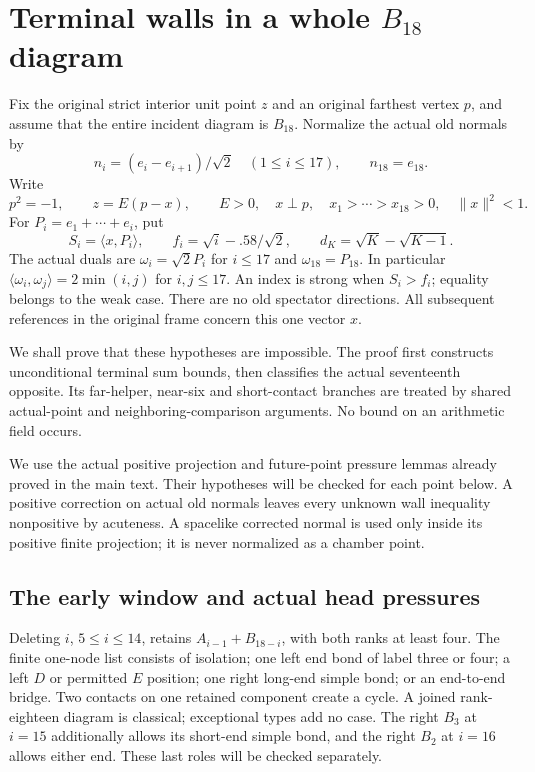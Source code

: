 \documentclass[11pt]{article}
\theoremstyle{definition}
\theoremstyle{remark}
\newcommand{\ip}[2]{\langle #1,#2\rangle}
\newcommand{\norm}[1]{\lVert #1\rVert}
\begin{document}
\section{Terminal walls in a whole \(B_{18}\) diagram}
\label{app:wholeB18}
Fix the original strict interior unit point \(z\) and an original
farthest vertex \(p\), and assume that the entire incident diagram
is \(B_{18}\). Normalize the actual old normals by
\[
 n_i=(e_i-e_{i+1})/\sqrt2\quad(1\leq i\leq17),\qquad n_{18}=e_{18}.
\]
Write
\[
 p^2=-1,\qquad z=E(p-x),\qquad E>0,\quad x\perp p,\quad
 x_1>\cdots>x_{18}>0,\quad \norm x^2<1.
\]
For \(P_i=e_1+\cdots+e_i\), put
\[
 S_i=\ip x{P_i},\qquad f_i=\sqrt i-.58/\sqrt2,\qquad
 d_K=\sqrt K-\sqrt{K-1}.
\]
The actual duals are \(\omega_i=\sqrt2P_i\) for \(i\leq17\)
and \(\omega_{18}=P_{18}\). In particular
\(\ip{\omega_i}{\omega_j}=2\min(i,j)\) for \(i,j\leq17\).
An index is strong when \(S_i>f_i\); equality belongs to the weak case.
There are no old spectator directions. All subsequent references
in the original frame concern this one vector \(x\).

We shall prove that these hypotheses are impossible. The proof first
constructs unconditional terminal sum bounds, then classifies the actual
seventeenth opposite. Its far-helper, near-six and short-contact branches
are treated by shared actual-point and neighboring-comparison arguments.
No bound on an arithmetic field occurs.

We use the actual positive projection and future-point pressure lemmas
already proved in the main text. Their hypotheses will be checked for
each point below. A positive correction on actual old normals leaves
every unknown wall inequality nonpositive by acuteness. A spacelike
corrected normal is used only inside its positive finite projection;
it is never normalized as a chamber point.

\subsection{The early window and actual head pressures}
\label{app:B18bulk}
Deleting \(i\), \(5\leq i\leq14\), retains
\(A_{i-1}+B_{18-i}\), with both ranks at least four.
The finite one-node list consists of isolation; one left end bond
of label three or four; a left \(D\) or permitted \(E\) position;
one right long-end simple bond; or an end-to-end bridge.
Two contacts on one retained component create a cycle. A joined
rank-eighteen diagram is classical; exceptional types add no case.
The right \(B_3\) at \(i=15\) additionally allows its short-end
simple bond, and the right \(B_2\) at \(i=16\) allows either end.
These last roles will be checked separately.
\end{document}
